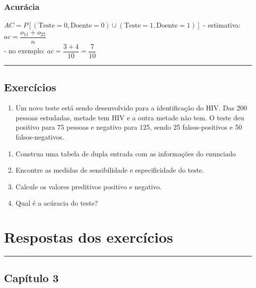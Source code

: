 \documentclass[
]{book}
\providecommand{\tightlist}{%
  \setlength{\itemsep}{0pt}\setlength{\parskip}{0pt}}
\begin{document}
\subsection{Acurácia}\label{acuruxe1cia}

\(AC = P\left[(\text{Teste}=0, \text{Doente} = 0) \cup (\text{Teste}=1, \text{Doente} = 1)\right]\)
- estimativa: \(ac = \dfrac{o_{11}+o_{22}}{n}\)\\
- no exemplo: \(ac = \dfrac{3+4}{10} = \dfrac{7}{10}\)

\begin{center}\rule{0.5\linewidth}{0.5pt}\end{center}

\section{Exercícios}\label{exercuxedcios-4}

\begin{enumerate}
\def\labelenumi{\arabic{enumi}.}
\tightlist
\item
  Um novo teste está sendo desenvolvido para a identificação do HIV. Das 200 pessoas estudadas, metade tem HIV e a outra metade não tem. O teste deu positivo para 75 pessoas e negativo para 125, sendo 25 falsos-positivos e 50 falsos-negativos.
\end{enumerate}

\begin{enumerate}
\def\labelenumi{(\alph{enumi})}
\tightlist
\item
  Construa uma tabela de dupla entrada com as informações do enunciado
\item
  Encontre as medidas de sensibilidade e especificidade do teste.
\item
  Calcule os valores preditivos positivo e negativo.
\item
  Qual é a acúracia do teste?
\end{enumerate}

\chapter{Respostas dos exercícios}\label{respostas-dos-exercuxedcios}

\begin{center}\rule{0.5\linewidth}{0.5pt}\end{center}

\section{Capítulo 3}\label{capuxedtulo-3}
\end{document}
